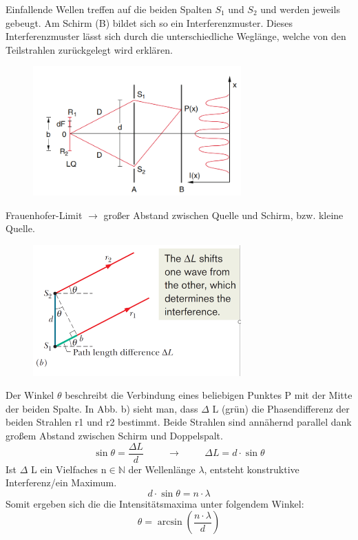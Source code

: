\documentclass[a4paper, 11pt, ngerman, parskip=half-]{scrartcl}
\begin{document}
Einfallende Wellen treffen auf die beiden Spalten $S_1$ und $S_2$ und werden jeweils gebeugt. Am Schirm (B) bildet sich so ein Interferenzmuster.
Dieses Interferenzmuster lässt sich durch die unterschiedliche Weglänge, welche von den Teilstrahlen zurückgelegt wird erklären.
\begin{figure}[H]
    \centering
    \includegraphics[width=8cm]{image/18_Interferenz/Youngscher_Doppelspalt.png}
\end{figure}
Frauenhofer-Limit $\rightarrow$ großer Abstand zwischen Quelle und Schirm, bzw. kleine Quelle.
\begin{figure}[H]
    \centering
    \includegraphics[width=8cm]{image/18_Interferenz/Doppelspalt_Wegunterschied.png}
\end{figure}
Der Winkel $\theta$ beschreibt die Verbindung eines beliebigen Punktes P mit der Mitte der beiden Spalte.
In Abb. b) sieht man, dass $\Delta$ L (grün) die Phasendifferenz der beiden Strahlen r1 und r2 bestimmt. Beide
Strahlen sind annähernd parallel dank großem Abstand zwischen Schirm und Doppelspalt.
\[\sin \theta = \frac{\Delta L}{d} \hspace{1cm} \rightarrow \hspace{1cm} \Delta L = d \cdot \sin \theta\]
Ist $\Delta$ L ein Vielfaches n$\in\mathbb{N}$ der Wellenlänge $\lambda$, entsteht konstruktive Interferenz/ein Maximum.
\[d \cdot \sin \theta = n \cdot \lambda\]
Somit ergeben sich die die Intensitätsmaxima unter folgendem Winkel:
\begin{equation}
    \label{eq:Intensitaetsmaxima_Young_Doppelspalt}
    \theta = \arcsin(\frac{n \cdot \lambda}{d})
\end{equation}
\end{document}
